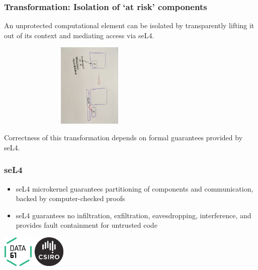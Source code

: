 \documentclass{beamer}
\begin{document}
\begin{frame}\frametitle{Transformation: Isolation of `at risk' components}

An unprotected computational element can be isolated by transparently
lifting it out of its context and mediating access via seL4.

\hspace*{10mm}\includegraphics[width=90mm,height=40mm]{vm.jpg}

 Correctness of this transformation depends on formal guarantees provided by seL4.

\end{frame}

\begin{frame}\frametitle{seL4}

\begin{itemize}
\item seL4 microkernel guarantees partitioning of components and
  communication, backed by computer-checked proofs

\item seL4 guarantees no infiltration, exfiltration, eavesdropping,
  interference, and provides fault containment for untrusted code

\end{itemize}

\vspace*{5mm}
\hspace*{10mm}\includegraphics[width=15mm,height=15mm]{data61-logo.png}
\hspace*{10mm}\includegraphics[width=15mm,height=15mm]{csiro--black.png}

\end{frame}
\end{document}
